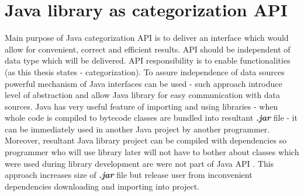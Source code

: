 \section{Java library as categorization API}
Main purpose of Java categorization API is to deliver an interface which would allow for convenient, correct and efficient results. API should be independent of data type which will be delivered. API responsibility is to enable functionalities (as this thesis states - categorization). To assure independence of data sources powerful mechanism of Java interfaces can be used - such approach introduce level of abstraction and allow Java library for easy communication with data sources. Java has very useful feature of importing and using libraries - when whole code is compiled to bytecode classes are bundled into resultant \textbf{\textit{.jar}} file - it can be immediately used in another Java project by another programmer. Moreover, resultant Java library project can be compiled with dependencies so programmer who will use library later will not have to bother about classes which were used during library development are were not part of Java API \cite{19}. This approach increases size of \textbf{\textit{.jar}} file but release user from inconvenient dependencies downloading and importing into project.    

